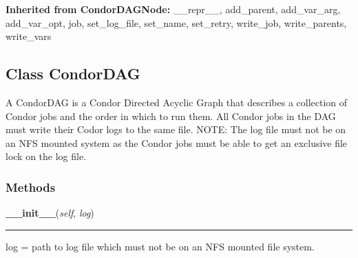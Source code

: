   \noindent\textbf{Inherited from CondorDAGNode:}
    \_\_repr\_\_,
    add\_parent,
    add\_var\_arg,
    add\_var\_opt,
    job,
    set\_log\_file,
    set\_name,
    set\_retry,
    write\_job,
    write\_parents,
    write\_vars


\subsection{Class CondorDAG}

    \label{pipeline:CondorDAG}
A CondorDAG is a Condor Directed Acyclic Graph that describes a 
collection of Condor jobs and the order in which to run them. All Condor 
jobs in the DAG must write their Codor logs to the same file. NOTE: The 
log file must not be on an NFS mounted system as the Condor jobs must be 
able to get an exclusive file lock on the log file.



  \subsubsection{Methods}

    \label{pipeline:CondorDAG:__init__}
    \vspace{0.5ex}

    \noindent\begin{boxedminipage}{\textwidth}

    \raggedright \textbf{\_\_init\_\_}(\textit{self}, \textit{log})

    \vspace{-1.5ex}

    \rule{\textwidth}{0.5\fboxrule}
    log = path to log file which must not be on an NFS mounted file 
    system.

    \vspace{1ex}

    \end{boxedminipage}

